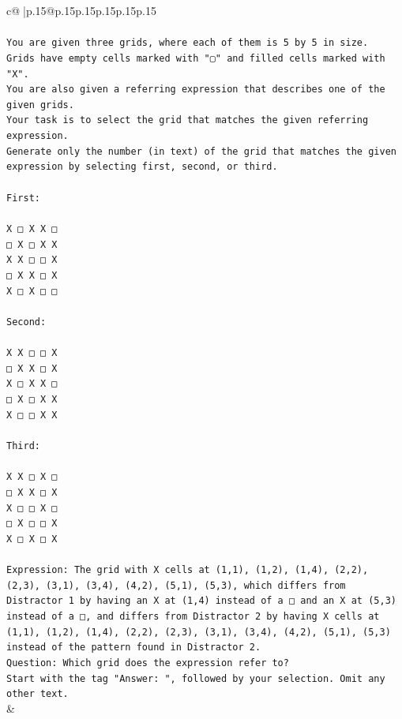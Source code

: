 \documentclass{article}
\begin{document}
{\begin{supertabular}{c@{$\;$}|p{.15\linewidth}@{}p{.15\linewidth}p{.15\linewidth}p{.15\linewidth}p{.15\linewidth}p{.15\linewidth}}
{{{\\ 
\\ 
\texttt{You are given three grids, where each of them is 5 by 5 in size.} \\
\texttt{Grids have empty cells marked with "▢" and filled cells marked with "X".} \\
\texttt{You are also given a referring expression that describes one of the given grids.} \\
\texttt{Your task is to select the grid that matches the given referring expression.} \\
\texttt{Generate only the number (in text) of the grid that matches the given expression by selecting first, second, or third.} \\
\\ 
\texttt{First:} \\
\\ 
\texttt{X □ X X □} \\
\texttt{□ X □ X X} \\
\texttt{X X □ □ X} \\
\texttt{□ X X □ X} \\
\texttt{X □ X □ □} \\
\\ 
\texttt{Second:} \\
\\ 
\texttt{X X □ □ X} \\
\texttt{□ X X □ X} \\
\texttt{X □ X X □} \\
\texttt{□ X □ X X} \\
\texttt{X □ □ X X} \\
\\ 
\texttt{Third:} \\
\\ 
\texttt{X X □ X □} \\
\texttt{□ X X □ X} \\
\texttt{X □ □ X □} \\
\texttt{□ X □ □ X} \\
\texttt{X □ X □ X} \\
\\ 
\texttt{Expression: The grid with X cells at (1,1), (1,2), (1,4), (2,2), (2,3), (3,1), (3,4), (4,2), (5,1), (5,3), which differs from Distractor 1 by having an X at (1,4) instead of a □ and an X at (5,3) instead of a □, and differs from Distractor 2 by having X cells at (1,1), (1,2), (1,4), (2,2), (2,3), (3,1), (3,4), (4,2), (5,1), (5,3) instead of the pattern found in Distractor 2.} \\
\texttt{Question: Which grid does the expression refer to?} \\
\texttt{Start with the tag "Answer: ", followed by your selection. Omit any other text.} \\
            }
        }
    }
    & \\ \\


\end{supertabular}}
\end{document}
